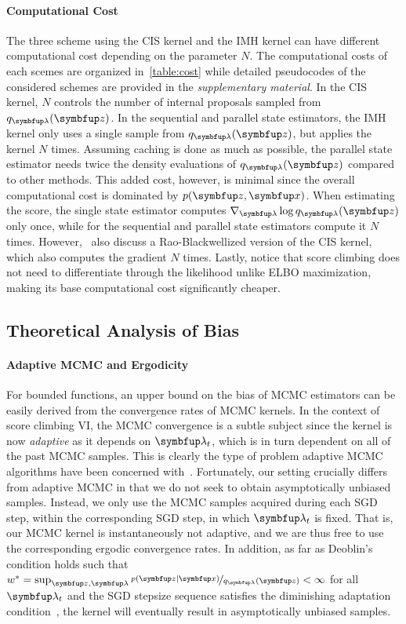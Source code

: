 \paragraph{Computational Cost}
The three scheme using the CIS kernel and the IMH kernel can have different computational cost depending on the parameter \(N\).
The computational costs of each scemes are organized in~\cref{table:cost} while detailed pseudocodes of the considered schemes are provided in the \textit{supplementary material}.
In the CIS kernel, \(N\) controls the number of internal proposals sampled from \(q_{\vlambda}(\vz)\).
In the sequential and parallel state estimators, the IMH kernel only uses a single sample from \(q_{\vlambda}(\vz)\), but applies the kernel \(N\) times.
Assuming caching is done as much as possible, the parallel state estimator needs twice the density evaluations of \(q_{\vlambda}(\vz)\) compared to other methods.
This added cost, however, is minimal since the overall computational cost is dominated by  \(p(\vz,\vx)\).
When estimating the score, the single state estimator computes \(\nabla_{\vlambda} \log q_{\vlambda}(\vz)\) only once, while for the sequential and parallel state estimators compute it \(N\) times.
However,~\cite{NEURIPS2020_b2070693} also discuss a Rao-Blackwellized version of the CIS kernel, which also computes the gradient \(N\) times.
Lastly, notice that score climbing does not need to differentiate through the likelihood unlike ELBO maximization, making its base computational cost significantly cheaper.

\subsection{Theoretical Analysis of Bias}\label{section:theory}
\vspace{-0.05in}
\paragraph{Adaptive MCMC and Ergodicity}
For bounded functions, an upper bound on the bias of MCMC estimators can be easily derived from the convergence rates of MCMC kernels.
In the context of score climbing VI, the MCMC convergence is a subtle subject since the kernel is now \textit{adaptive} as it depends on \(\vlambda_t\), which is in turn dependent on all of the past MCMC samples.
This is clearly the type of problem adaptive MCMC algorithms have been concerned with~\citep{andrieu_ergodicity_2006}.
Fortunately, our setting crucially differs from adaptive MCMC in that we do not seek to obtain asymptotically unbiased samples.
Instead, we only use the MCMC samples acquired during each SGD step, within the corresponding SGD step, in which \(\vlambda_t\) is fixed.
That is, our MCMC kernel is instantaneously not adaptive, and we are thus free to use the corresponding ergodic convergence rates.
In addition, as far as Deoblin's condition holds such that \(w^* = \sup_{\vz, \vlambda} \nicefrac{p\left(\vz\mid\vx\right)}{q_{\vlambda}\left(\vz\right)}  < \infty\) for all \(\vlambda_t\) and the SGD stepsize sequence satisfies the diminishing adaptation condition~\citep{10.2307/27595854}, the kernel will eventually result in asymptotically unbiased samples.

